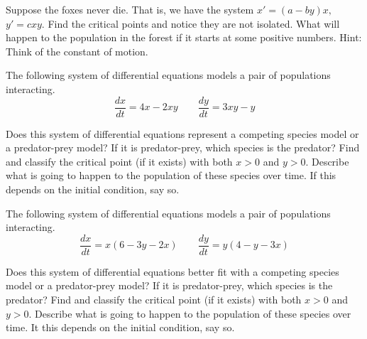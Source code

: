\documentclass{ximera}
\begin{document}
\begin{exercise}%
    Suppose the foxes never die.  That is, we have the system $x' = (a-by)x,$ $y' = cxy$. Find the critical points and notice they are not isolated. What will happen to the population in the forest if it starts at some positive numbers.  Hint: Think of the constant of motion.
\end{exercise}

\begin{exercise}
    The following system of differential equations models a pair of populations interacting. 
    \[ 
        \frac{dx}{dt} = 4x - 2xy \qquad \frac{dy}{dt} = 3xy - y 
    \]
    \begin{tasks}
        \task Does this system of differential equations represent a competing species model or a predator-prey model? If it is predator-prey, which species is the predator?
        \task Find and classify the critical point (if it exists) with both $x>0$ and $y>0$.
        \task Describe what is going to happen to the population of these species over time. If this depends on the initial condition, say so.
    \end{tasks}
\end{exercise}

\begin{exercise}
    The following system of differential equations models a pair of populations interacting. 
    \[ 
        \frac{dx}{dt} = x(6 - 3y - 2x)  \qquad \frac{dy}{dt} = y(4 - y - 3x) 
    \]
    \begin{tasks}
        \task Does this system of differential equations better fit with a competing species model or a predator-prey model? If it is predator-prey, which species is the predator?
        \task Find and classify the critical point (if it exists) with both $x>0$ and $y>0$.
        \task Describe what is going to happen to the population of these species over time. It this depends on the initial condition, say so.
    \end{tasks}
\end{exercise}
\end{document}
